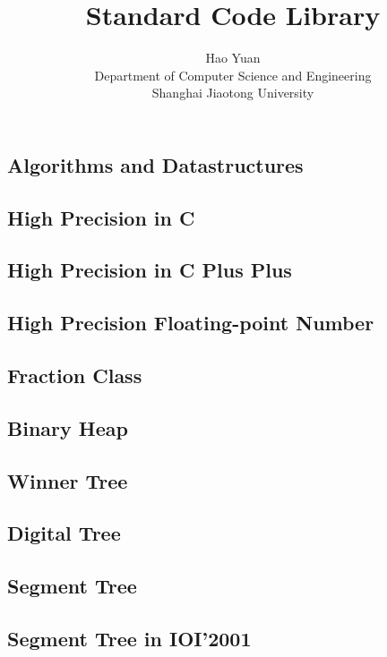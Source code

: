 \documentclass{report}
\begin{document}
\begin{CJK*}{GBK}{kai}

\title{Standard Code Library}
\author{Hao Yuan\\Department of Computer Science and Engineering\\Shanghai Jiaotong University}
\maketitle \tableofcontents

\chapter{Algorithms and Datastructures}
\section{High Precision in C }

\section{High Precision in C Plus Plus}

\section{High Precision Floating-point Number}

\section{Fraction Class} \label{fraction_class}

\section{Binary Heap}

\section{Winner Tree}

\clearpage
\section{Digital Tree}

\section{Segment Tree}

\section{Segment Tree in IOI'2001}


\end{CJK*}
\end{document}
